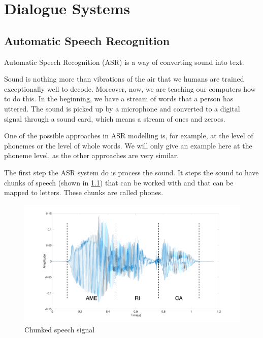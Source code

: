 \chapter{Dialogue Systems} \label{chap:dialogue_systems}



\section{Automatic Speech Recognition}

Automatic Speech Recognition (ASR) is a way of converting sound into text.

Sound is nothing more than vibrations of the air that we humans are trained exceptionally well to decode. Moreover, now, we are teaching our computers how to do this. In the beginning, we have a stream of words that a person has uttered. The sound is picked up by a microphone and converted to a digital signal through a sound card, which means a stream of ones and zeroes.

One of the possible approaches in ASR modelling is, for example, at the level of phonemes or the level of whole words. We will only give an example here at the phoneme level, as the other approaches are very similar.

The first step the ASR system do is process the sound. It steps the sound to have chunks of speech (shown in \cref{fig:chunked_voice}) that can be worked with and that can be mapped to letters. These chunks are called phones.

\begin{figure}[H]
    \centering
    \includegraphics[width=\textwidth]{img/voice_edit.png}
    \caption{Chunked speech signal}
    \label{fig:chunked_voice}
\end{figure}

